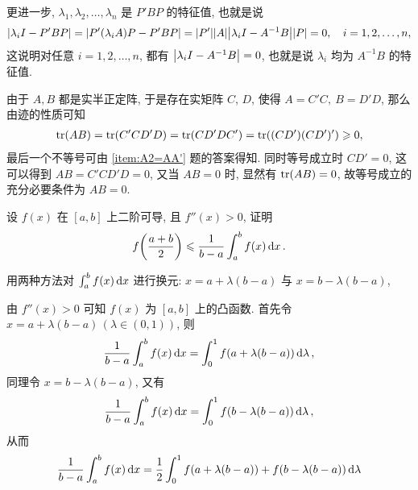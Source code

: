 \begin{exercise}[series=exer]
\begin{answer}
\begin{answersheet}
          更进一步, $ \lambda_{1}, \lambda_{2}, \dots, \lambda_{n} $ 是 $ P'BP $ 的特征值, 也就是说
          \begin{align*}
              \abs{\lambda_{i}I - P'BP} = \abs{P'(\lambda_{i}A)P - P'BP} = \abs{P'}\abs{A}\abs{\lambda_{i} I - A^{-1}B}\abs{P} = 0, \quad i = 1, 2, \dots, n,
          \end{align*}
          这说明对任意 $ i = 1, 2, \dots, n $, 都有 $ \abs{\lambda_{i} I - A^{-1}B} = 0 $, 也就是说 $ \lambda_{i} $ 均为 $ A^{-1}B $ 的特征值.
          \item 由于 $ A, B $ 都是实半正定阵, 于是存在实矩阵 $ C $, $ D $, 使得 $ A = C'C,\ B = D'D $, 那么由迹的性质可知
          \begin{align*}
              \tr(AB) = \tr(C'CD'D) = \tr(CD'DC') = \tr((CD')(CD')') \geqslant 0,
          \end{align*}
          最后一个不等号可由 \ref{item:A2=AA'} 题的答案得知. 同时等号成立时 $ CD' = 0 $, 这可以得到 $ AB = C'CD'D = 0 $, 又当 $ AB = 0 $ 时, 显然有 $ \tr(AB) = 0 $, 故等号成立的充分必要条件为 $ AB = 0 $.
      \end{answersheet}
  \end{answer}
  \item 设 $ f(x) $ 在 $ [a, b] $ 上二阶可导, 且 $ f''(x) > 0 $, 证明
  \begin{align*}
      f\qty(\frac{a + b}{2}) \le \frac{1}{b - a} \int_{a}^{b} f(x) \dx*.
  \end{align*}
  \begin{hint}
      用两种方法对 $ \int_{a}^{b} f(x) \dx* $ 进行换元: $ x = a + \lambda(b - a) $ 与 $ x = b - \lambda(b - a) $,
  \end{hint}
  \begin{answer}
      由 $ f''(x) > 0 $ 可知 $ f(x) $ 为 $ [a, b] $ 上的凸函数. 首先令 $ x = a + \lambda(b - a)\,(\lambda \in (0, 1)) $, 则
      \begin{align*}
          \frac{1}{b - a}\int_{a}^{b} f(x) \dx* = \int_{0}^{1} f(a + \lambda(b - a)) \dd{\lambda},
      \end{align*}
      同理令 $ x = b - \lambda(b - a) $, 又有
      \begin{align*}
          \frac{1}{b - a}\int_{a}^{b} f(x) \dx* = \int_{0}^{1} f(b - \lambda(b - a)) \dd{\lambda},
      \end{align*}
      从而
      \begin{align*}
          \frac{1}{b - a}\int_{a}^{b} f(x) \dx* = \frac{1}{2} \int_{0}^{1} f(a + \lambda(b - a)) + f(b - \lambda(b - a)) \dd{\lambda}

\end{align*}
\end{answer}
\end{exercise}
